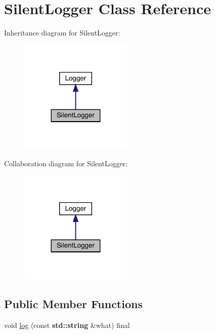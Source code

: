 \hypertarget{class_silent_logger}{}\section{Silent\+Logger Class Reference}
\label{class_silent_logger}


Inheritance diagram for Silent\+Logger\+:\nopagebreak
\begin{figure}[H]
\begin{center}
\leavevmode
\includegraphics[width=152pt]{class_silent_logger__inherit__graph}
\end{center}
\end{figure}


Collaboration diagram for Silent\+Logger\+:\nopagebreak
\begin{figure}[H]
\begin{center}
\leavevmode
\includegraphics[width=152pt]{class_silent_logger__coll__graph}
\end{center}
\end{figure}
\subsection*{Public Member Functions}
\begin{DoxyCompactItemize}
\item 
void \hyperlink{class_silent_logger_aa1b9872cb1585ec35051b3264d06aefd}{log} (const \textbf{ std\+::string} \&what) final
\end{DoxyCompactItemize}



